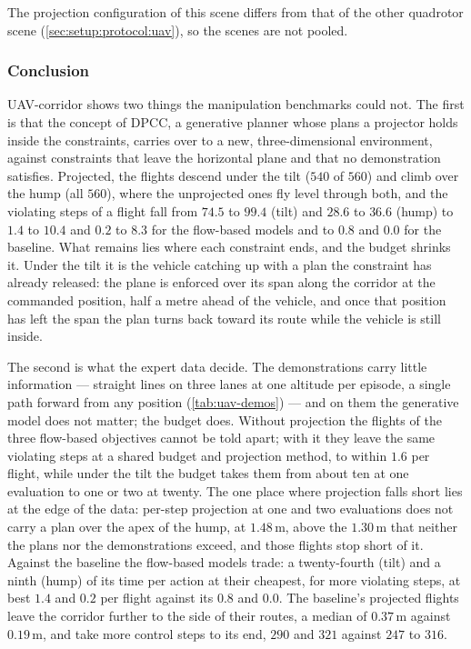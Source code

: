 The projection configuration of this scene differs from that of the other quadrotor scene
(\autoref{sec:setup:protocol:uav}), so the scenes are not pooled.

\subsubsection{Conclusion}\label{sec:res:uav:corridor:conclusion}

UAV-corridor shows two things the manipulation benchmarks could not. The first is that the concept of
\ac{DPCC}, a generative planner whose plans a projector holds inside the constraints, carries over to a new,
three-dimensional environment, against constraints that leave the horizontal plane and that no demonstration
satisfies. Projected, the flights descend under the tilt ($540$ of $560$) and climb over the hump (all $560$),
where the unprojected ones fly level through both, and the violating steps of a flight fall from $74.5$ to
$99.4$ (tilt) and $28.6$ to $36.6$ (hump) to $1.4$ to $10.4$ and $0.2$ to $8.3$ for the flow-based models and
to $0.8$ and $0.0$ for the baseline. What remains lies where each constraint ends, and the budget shrinks it.
Under the tilt it is the vehicle catching up with a plan the constraint has already released: the plane is
enforced over its span along the corridor at the commanded position, half a metre ahead of the vehicle, and
once that position has left the span the plan turns back toward its route while the vehicle is still inside.

The second is what the expert data decide. The demonstrations carry little information --- straight lines on
three lanes at one altitude per episode, a single path forward from any position (\autoref{tab:uav-demos})
--- and on them the generative model does not matter; the budget does. Without projection the flights of the
three flow-based objectives cannot be told apart; with it they leave the same violating steps at a shared
budget and projection method, to within $1.6$ per flight, while under the tilt the budget takes them from
about ten at one evaluation to one or two at twenty. The one place where projection falls short lies at the
edge of the data: per-step projection at one and two evaluations does not carry a plan over the apex of the
hump, at $1.48$\,m, above the $1.30$\,m that neither the plans nor the demonstrations exceed, and those flights
stop short of it. Against the baseline the flow-based models trade: a twenty-fourth (tilt) and a ninth (hump)
of its time per action at their cheapest, for more violating steps, at best $1.4$ and $0.2$ per flight against its
$0.8$ and $0.0$. The baseline's projected flights leave the corridor further to the side of their routes, a
median of $0.37$\,m against $0.19$\,m, and take more control steps to its end, $290$ and $321$ against $247$ to
$316$.

